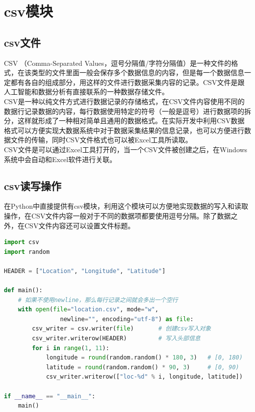 \newpage

\section{csv模块}

\subsection{csv文件}

CSV （Comma-Separated Values，逗号分隔值/字符分隔值）是一种文件的格式，在该类型的文件里面一般会保存多个数据信息的内容，但是每一个数据信息一定都有各自的组成部分，用这样的文件进行数据采集内容的记录。CSV文件是跟人工智能和数据分析有直接联系的一种数据存储文件。\\

CSV是一种以纯文件方式进行数据记录的存储格式，在CSV文件内容使用不同的数据行记录数据的内容，每行数据使用特定的符号（一般是逗号）进行数据项的拆分，这样就形成了一种相对简单且通用的数据格式。在实际开发中利用CSV数据格式可以方便实现大数据系统中对于数据采集结果的信息记录，也可以方便进行数据文件的传输，同时CSV文件格式也可以被Excel工具所读取。\\

CSV文件是可以通过Excel工具打开的，当一个CSV文件被创建之后，在Windows系统中会自动和Excel软件进行关联。\\

\subsection{csv读写操作}

在Python中直接提供有csv模块，利用这个模块可以方便地实现数据的写入和读取操作，在CSV文件内容一般对于不同的数据项都要使用逗号分隔。除了数据之外，在CSV文件内容还可以设置文件标题。\\


\begin{lstlisting}[language=Python]
import csv
import random

HEADER = ["Location", "Longitude", "Latitude"]

def main():
    # 如果不使用newline，那么每行记录之间就会多出一个空行
    with open(file="location.csv", mode="w", 
                newline="", encoding="utf-8") as file:
        csv_writer = csv.writer(file)       # 创建csv写入对象
        csv_writer.writerow(HEADER)         # 写入头部信息
        for i in range(1, 11):
            longitude = round(random.random() * 180, 3)   # [0, 180)
            latitude = round(random.random() * 90, 3)     # [0, 90)
            csv_writer.writerow(["loc-%d" % i, longitude, latitude])

if __name__ == "__main__":
    main()
\end{lstlisting}

